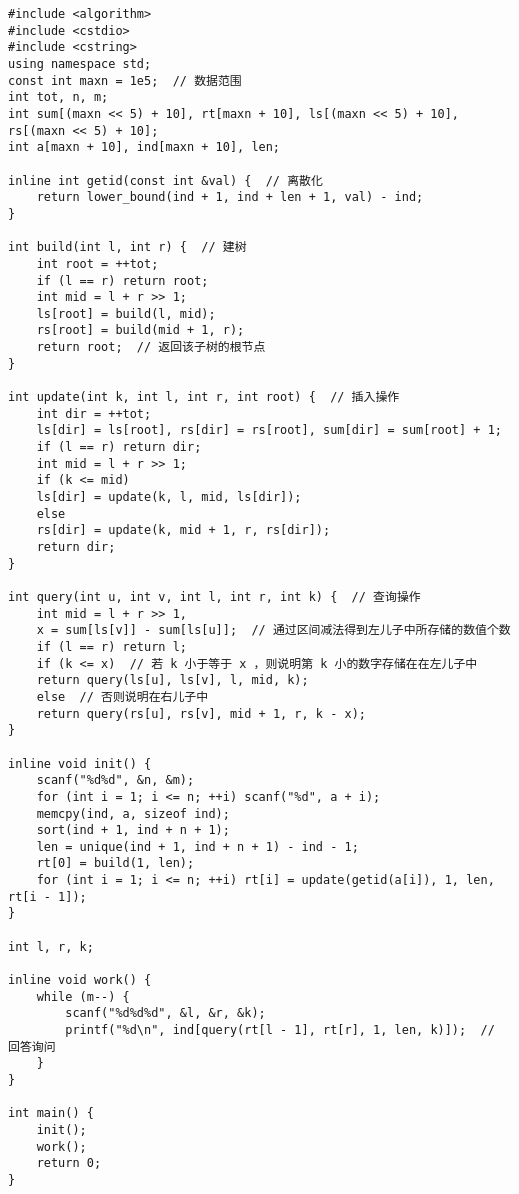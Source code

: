 \begin{lstlisting}
#include <algorithm>
#include <cstdio>
#include <cstring>
using namespace std;
const int maxn = 1e5;  // 数据范围
int tot, n, m;
int sum[(maxn << 5) + 10], rt[maxn + 10], ls[(maxn << 5) + 10],
rs[(maxn << 5) + 10];
int a[maxn + 10], ind[maxn + 10], len;

inline int getid(const int &val) {  // 离散化
	return lower_bound(ind + 1, ind + len + 1, val) - ind;
}

int build(int l, int r) {  // 建树
	int root = ++tot;
	if (l == r) return root;
	int mid = l + r >> 1;
	ls[root] = build(l, mid);
	rs[root] = build(mid + 1, r);
	return root;  // 返回该子树的根节点
}

int update(int k, int l, int r, int root) {  // 插入操作
	int dir = ++tot;
	ls[dir] = ls[root], rs[dir] = rs[root], sum[dir] = sum[root] + 1;
	if (l == r) return dir;
	int mid = l + r >> 1;
	if (k <= mid)
	ls[dir] = update(k, l, mid, ls[dir]);
	else
	rs[dir] = update(k, mid + 1, r, rs[dir]);
	return dir;
}

int query(int u, int v, int l, int r, int k) {  // 查询操作
	int mid = l + r >> 1,
	x = sum[ls[v]] - sum[ls[u]];  // 通过区间减法得到左儿子中所存储的数值个数
	if (l == r) return l;
	if (k <= x)  // 若 k 小于等于 x ，则说明第 k 小的数字存储在在左儿子中
	return query(ls[u], ls[v], l, mid, k);
	else  // 否则说明在右儿子中
	return query(rs[u], rs[v], mid + 1, r, k - x);
}

inline void init() {
	scanf("%d%d", &n, &m);
	for (int i = 1; i <= n; ++i) scanf("%d", a + i);
	memcpy(ind, a, sizeof ind);
	sort(ind + 1, ind + n + 1);
	len = unique(ind + 1, ind + n + 1) - ind - 1;
	rt[0] = build(1, len);
	for (int i = 1; i <= n; ++i) rt[i] = update(getid(a[i]), 1, len, rt[i - 1]);
}

int l, r, k;

inline void work() {
	while (m--) {
		scanf("%d%d%d", &l, &r, &k);
		printf("%d\n", ind[query(rt[l - 1], rt[r], 1, len, k)]);  // 回答询问
	}
}

int main() {
	init();
	work();
	return 0;
}
\end{lstlisting}